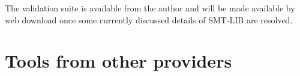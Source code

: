\documentclass[12pt,oneside]{report}
\newcommand{\nospace}{\setlength{\itemsep}{0in}\setlength{\parsep}{0in}\setlength{\parskip}{0in}\setlength{\topsep}{0in}}
\begin{document}

The validation suite is available from the author and will be made available by web download once some 
currently discussed details of SMT-LIB are resolved.

\section{Tools from other providers}
\end{document}
